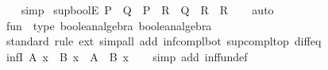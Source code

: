 \begin{isabellebody}
%
\isadelimproof
\ \ %
\endisadelimproof
%
\isatagproof
{}\isamarkupfalse%
\ simp%
\endisatagproof
{\isafoldproof}%
%
\isadelimproof
\isanewline
%
\endisadelimproof
\isanewline
{}\isamarkupfalse%
\ sup{\isacharunderscore}{\kern0pt}boolE{\isacharcolon}{\kern0pt}\ {\isachardoublequoteopen}P\ {\isasymsqunion}\ Q\ {\isasymLongrightarrow}\ {\isacharparenleft}{\kern0pt}P\ {\isasymLongrightarrow}\ R{\isacharparenright}{\kern0pt}\ {\isasymLongrightarrow}\ {\isacharparenleft}{\kern0pt}Q\ {\isasymLongrightarrow}\ R{\isacharparenright}{\kern0pt}\ {\isasymLongrightarrow}\ R{\isachardoublequoteclose}\isanewline
%
\isadelimproof
\ \ %
\endisadelimproof
%
\isatagproof
{}\isamarkupfalse%
\ auto%
\endisatagproof
{\isafoldproof}%
%
\isadelimproof
\isanewline
%
\endisadelimproof
\isanewline
{}\isamarkupfalse%
\ {\isachardoublequoteopen}fun{\isachardoublequoteclose}\ {\isacharcolon}{\kern0pt}{\isacharcolon}{\kern0pt}\ {\isacharparenleft}{\kern0pt}type{\isacharcomma}{\kern0pt}\ boolean{\isacharunderscore}{\kern0pt}algebra{\isacharparenright}{\kern0pt}\ boolean{\isacharunderscore}{\kern0pt}algebra\isanewline
%
\isadelimproof
\ \ %
\endisadelimproof
%
\isatagproof
{}\isamarkupfalse%
\ standard\ {\isacharparenleft}{\kern0pt}rule\ ext{\isacharcomma}{\kern0pt}\ simp{\isacharunderscore}{\kern0pt}all\ add{\isacharcolon}{\kern0pt}\ inf{\isacharunderscore}{\kern0pt}compl{\isacharunderscore}{\kern0pt}bot\ sup{\isacharunderscore}{\kern0pt}compl{\isacharunderscore}{\kern0pt}top\ diff{\isacharunderscore}{\kern0pt}eq{\isacharparenright}{\kern0pt}{\isacharplus}{\kern0pt}%
\endisatagproof
{\isafoldproof}%
%
\isadelimproof
%
\endisadelimproof
%
\isadelimdocument
%
\endisadelimdocument
%
\isatagdocument
%
\isamarkuptrue%
%
\endisatagdocument
{\isafolddocument}%
%
\isadelimdocument
%
\endisadelimdocument
{}\isamarkupfalse%
\ inf{}I{\isacharcolon}{\kern0pt}\ {\isachardoublequoteopen}A\ x\ {\isasymLongrightarrow}\ B\ x\ {\isasymLongrightarrow}\ {\isacharparenleft}{\kern0pt}A\ {\isasymsqinter}\ B{\isacharparenright}{\kern0pt}\ x{\isachardoublequoteclose}\isanewline
%
\isadelimproof
\ \ %
\endisadelimproof
%
\isatagproof
{}\isamarkupfalse%
\ {\isacharparenleft}{\kern0pt}simp\ add{\isacharcolon}{\kern0pt}\ inf{\isacharunderscore}{\kern0pt}fun{\isacharunderscore}{\kern0pt}def{\isacharparenright}{\kern0pt}%
\endisatagproof
{\isafoldproof}%
%
\isadelimproof
\isanewline
%
\endisadelimproof
\isanewline
{}\isamarkupfalse%

\end{isabellebody}
